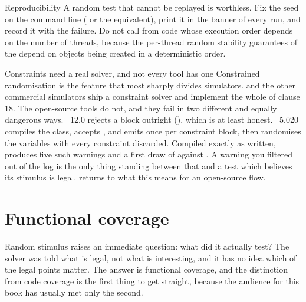 \begin{tipbox}{Reproducibility}
A random test that cannot be replayed is worthless. Fix the seed on the
command line ( or the equivalent), print it in the
banner of every run, and record it with the failure. Do not call
 from code whose execution order depends on the number of
threads, because the per-thread random stability guarantees of the \LRM{}
depend on objects being created in a deterministic order.
\end{tipbox}

\begin{notebox}{Constraints need a real solver, and not every tool has one}
Constrained randomisation is the feature that most sharply divides simulators.
 and the other commercial simulators ship a constraint solver
and implement the whole of clause 18. The open-source tools do not, and they
fail in two different and equally dangerous ways.
~12.0 rejects a  block outright
(), which is at least
honest. ~5.020 compiles the class, accepts
, and emits  once per constraint block, then randomises the
 variables with every constraint discarded. Compiled exactly as
written,  produces five such warnings and a first draw
of  against . A warning you
filtered out of the log is the only thing standing between that and a test
which believes its stimulus is legal.
 returns to what this means for an open-source flow.
\end{notebox}

\section{Functional coverage}
\label{sec:beyond:cov}
\label{sec:toolkit:cov}

Random stimulus raises an immediate question: what did it actually test? The
solver was told what is legal, not what is interesting, and it has no idea
which of the legal points matter. The answer is functional coverage, and the
distinction from code coverage is the first thing to get straight, because the
audience for this book has usually met only the second.

